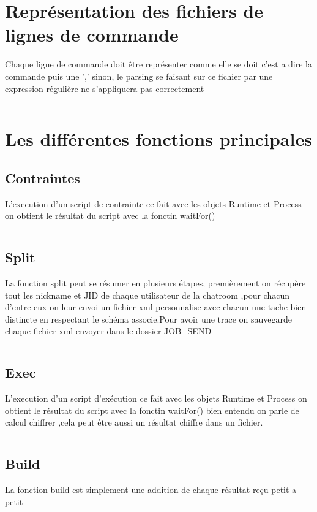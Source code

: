 \documentclass[11pt]{report}
\begin{document}
\inputminted{XML}{../Schema_XML/BDD_JOB.xsd}
\newpage 

\section{Représentation des fichiers de lignes de commande} 
Chaque ligne de commande doit être représenter comme elle se doit c'est a dire la commande puis une ',' sinon, le parsing se faisant sur ce fichier par une expression régulière ne s’appliquera pas correctement  
\inputminted{bash}{../Echantillon_Script_Cmd/cmd.dc}
\newpage
\section{Les différentes fonctions principales}

\subsection{Contraintes} 
L'execution d'un script de contrainte ce fait avec les objets Runtime et Process on obtient le résultat du script avec la fonctin waitFor() 
\inputminted{perl}{../Echantillon_Script_Perl/DitributionContraintes.pl}
\subsection{Split} 
La fonction split peut se résumer en plusieurs étapes, premièrement on récupère tout les nickname et JID de chaque utilisateur de la chatroom ,pour chacun d'entre eux on leur envoi un fichier xml personnalise avec chacun une tache bien distincte en respectant le schéma associe.Pour avoir une trace on sauvegarde chaque fichier xml envoyer dans le dossier JOB\_SEND
\inputminted[tabsize=2,frame=lines,linenos]{java}{Fichier_import/split.java}
\subsection{Exec} 
L'execution d'un script d’exécution ce fait avec les objets Runtime et Process on obtient le résultat du script avec la fonctin waitFor() bien entendu on parle de calcul chiffrer ,cela peut être aussi un résultat chiffre dans un fichier. 
\inputminted[tabsize=2,frame=lines,linenos]{Perl}{Fichier_import/calcul.pl}
\subsection{Build} 
La fonction build est simplement une addition de chaque résultat reçu petit a petit 
\inputminted[tabsize=2,frame=lines,linenos]{Perl}{Fichier_import/build.java}
\newpage
\end{document}
